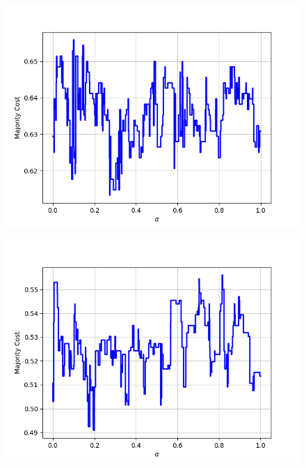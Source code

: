 \begin{figure}[h]
\begin{minipage}{.19\textwidth}
  {\includegraphics[width=\linewidth]{plots/omniglot-intra-ac-cnn/Braille}}
\end{minipage}
\begin{minipage}{.19\textwidth}
  \centering
  {\includegraphics[width=\linewidth]{plots/omniglot-intra-ac-cnn/Burmese_(Myanmar)}}
\end{minipage}
\begin{minipage}{.19\textwidth}
  \centering

\end{minipage}
\end{figure}
